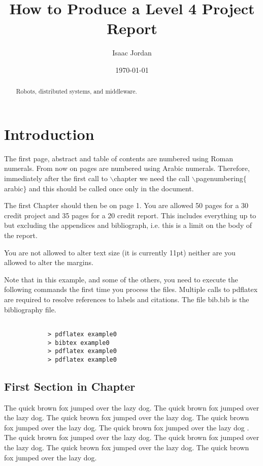 \documentclass{l4proj}
\begin{document}
\title{How to Produce a Level 4 Project Report}
\author{Isaac Jordan}
\date{\today}
\maketitle

\begin{abstract}
Robots, distributed systems, and middleware.
\end{abstract}

\educationalconsent
%
%
\tableofcontents

\chapter{Introduction}
The first page, abstract and table of contents are numbered using Roman numerals. From now on pages are numbered
using Arabic numerals. Therefore, immediately after the first call to $\backslash$chapter we need the call
$\backslash$pagenumbering$\{$arabic$\}$ and this should be called once only in the document. 

The first Chapter should then be on page 1. You are allowed 50 pages for a 30 credit project and 35 pages for a 
20 credit report. This includes everything up to but excluding the appendices and bibliograph, i.e. this is a limit on
the body of the report.

You are not allowed to alter text size (it is currently 11pt) neither are you allowed to alter the margins.

Note that in this example, and some of the others, you need to execute the following commands the first time you process the files.
Multiple calls to pdflatex are required to resolve references to labels and citations. The file bib.bib is the bibliography file.

\begin{verbatim}

            > pdflatex example0
            > bibtex example0
            > pdflatex example0
            > pdflatex example0

\end{verbatim}


\section{First Section in Chapter}
The quick brown fox jumped over the lazy dog.
The quick brown fox jumped over the lazy dog.
The quick brown fox jumped over the lazy dog.
The quick brown fox jumped over the lazy dog.
The quick brown fox jumped over the lazy dog \cite{DIMACS}.
The quick brown fox jumped over the lazy dog.
The quick brown fox jumped over the lazy dog.
The quick brown fox jumped over the lazy dog.
The quick brown fox jumped over the lazy dog.
\end{document}
